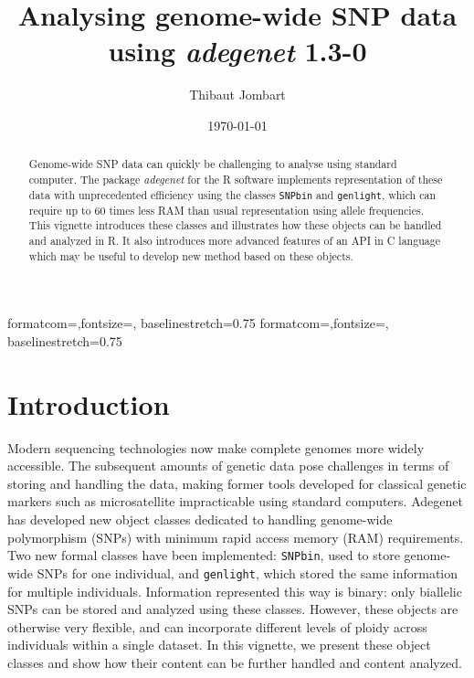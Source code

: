 \documentclass{article}
\title{Analysing genome-wide SNP data using  \textit{adegenet} 1.3-0}
\author{Thibaut Jombart}
\date{\today}
\begin{document}
{formatcom={\color{Sinput}},fontsize=\footnotesize, baselinestretch=0.75}
{formatcom={\color{Soutput}},fontsize=\footnotesize, baselinestretch=0.75}

\color{black}

\maketitle

\begin{abstract}
  Genome-wide SNP data can quickly be challenging to analyse using standard
  computer. The package \textit{adegenet} \cite{tjart05} for the R software \cite{np145}
  implements representation of these data with unprecedented efficiency
  using the classes \texttt{SNPbin} and \texttt{genlight}, which can require up to 60 times less RAM than usual
  representation using allele frequencies.
  This vignette introduces these classes and illustrates how these objects can be handled and
  analyzed in R.
  It also introduces more advanced features of an API in C language which may be useful to develop
  new method based on these objects.
\end{abstract}

\newpage

\tableofcontents


\newpage
\section{Introduction}
Modern sequencing technologies now make complete genomes more widely accessible.
The subsequent amounts of genetic data pose challenges in terms of storing and handling the data,
making former tools developed for classical genetic markers such as microsatellite impracticable using
standard computers.
Adegenet has developed new object classes dedicated to handling genome-wide polymorphism (SNPs) with
minimum rapid access memory (RAM) requirements.
\\

Two new formal classes have been implemented: \texttt{SNPbin}, used to store genome-wide SNPs for
one individual, and \texttt{genlight}, which stored the same information for multiple individuals.
Information represented this way is binary: only biallelic SNPs can be stored and analyzed using these classes.
However, these objects are otherwise very flexible, and can incorporate different levels of ploidy
across individuals within a single dataset.
In this vignette, we present these object classes and show how their content can be further handled and
content analyzed.
\end{document}
